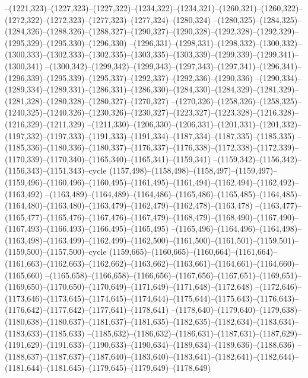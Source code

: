 --(1221,323)--(1227,323)--(1227,322)--(1234,322)--(1234,321)--(1260,321)--(1260,322)--(1272,322)--(1272,323)--(1277,323)--(1277,324)--(1280,324)
--(1280,325)--(1284,325)--(1284,326)--(1288,326)--(1288,327)--(1290,327)--(1290,328)--(1292,328)--(1292,329)--(1295,329)--(1295,330)--(1296,330)
--(1296,331)--(1298,331)--(1298,332)--(1300,332)--(1300,333)--(1302,333)--(1302,335)--(1303,335)--(1303,339)--(1299,339)--(1299,341)--(1300,341)
--(1300,342)--(1299,342)--(1299,343)--(1297,343)--(1297,341)--(1296,341)--(1296,339)--(1295,339)--(1295,337)--(1292,337)--(1292,336)--(1290,336)
--(1290,334)--(1289,334)--(1289,331)--(1286,331)--(1286,330)--(1284,330)--(1284,329)--(1281,329)--(1281,328)--(1280,328)--(1280,327)--(1270,327)
--(1270,326)--(1258,326)--(1258,325)--(1240,325)--(1240,326)--(1230,326)--(1230,327)--(1223,327)--(1223,328)--(1216,328)--(1216,329)--(1211,329)
--(1211,330)--(1206,330)--(1206,331)--(1201,331)--(1201,332)--(1197,332)--(1197,333)--(1191,333)--(1191,334)--(1187,334)--(1187,335)--(1185,335)
--(1185,336)--(1180,336)--(1180,337)--(1176,337)--(1176,338)--(1172,338)--(1172,339)--(1170,339)--(1170,340)--(1165,340)--(1165,341)--(1159,341)
--(1159,342)--(1156,342)--(1156,343)--(1151,343)--cycle
(1157,498)--(1158,498)--(1158,497)--(1159,497)--(1159,496)--(1160,496)--(1160,495)--(1161,495)--(1161,494)--(1162,494)--(1162,492)--(1163,492)
--(1163,489)--(1164,489)--(1164,486)--(1165,486)--(1165,485)--(1164,485)--(1164,480)--(1163,480)--(1163,479)--(1162,479)--(1162,478)--(1163,478)
--(1163,477)--(1165,477)--(1165,476)--(1167,476)--(1167,479)--(1168,479)--(1168,490)--(1167,490)--(1167,493)--(1166,493)--(1166,495)--(1165,495)
--(1165,496)--(1164,496)--(1164,498)--(1163,498)--(1163,499)--(1162,499)--(1162,500)--(1161,500)--(1161,501)--(1159,501)--(1159,500)--(1157,500)--cycle
(1159,665)--(1160,665)--(1160,664)--(1161,664)--(1161,663)--(1162,663)--(1162,662)--(1163,662)--(1163,661)--(1164,661)--(1164,660)--(1165,660)
--(1165,658)--(1166,658)--(1166,656)--(1167,656)--(1167,651)--(1169,651)--(1169,650)--(1170,650)--(1170,649)--(1171,649)--(1171,648)--(1172,648)
--(1172,646)--(1173,646)--(1173,645)--(1174,645)--(1174,644)--(1175,644)--(1175,643)--(1176,643)--(1176,642)--(1177,642)--(1177,641)--(1178,641)
--(1178,640)--(1179,640)--(1179,638)--(1180,638)--(1180,637)--(1181,637)--(1181,635)--(1182,635)--(1182,634)--(1183,634)--(1183,633)--(1185,633)
--(1185,632)--(1186,632)--(1186,631)--(1187,631)--(1187,629)--(1191,629)--(1191,633)--(1190,633)--(1190,634)--(1189,634)--(1189,636)--(1188,636)
--(1188,637)--(1187,637)--(1187,640)--(1183,640)--(1183,641)--(1182,641)--(1182,644)--(1181,644)--(1181,645)--(1179,645)--(1179,649)--(1178,649)
